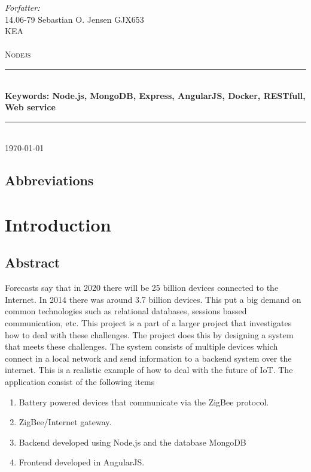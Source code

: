 \documentclass[a4paper,12pt,english]{article}
\begin{document}
\begin{titlepage}

\newcommand{\HRule}{\rule{\linewidth}{0.4mm}}
\center
\small{ \emph{Forfatter:}\\
14.06-79 Sebastian O. Jensen \textsc{GJX653}
} \\[2cm]

\textsc{\LARGE KEA}\\[0.5cm]
\textsc{\large}\\[1.5cm]
\textsc{\huge Nodejs}\\
\HRule \\[0.7cm]
{\bfseries Keywords: Node.js, MongoDB, Express, AngularJS, Docker,
RESTfull, Web service}\\[0.4cm]
\HRule
\\[1.5cm] \textsc{\Large \textsc{\today}}\\[0.5cm]

\end{titlepage}
\tableofcontents


\clearpage
\subsection{Abbreviations}
\renewcommand{\nomname}{}
\renewcommand{\pagedeclaration}[1]{}
\pagestyle{empty}
\printnomenclature[3cm]
\clearpage
\section{Introduction}
\subsection{Abstract}
Forecasts say that in 2020 there will be 25 billion devices connected to the
Internet. In 2014 there was around 3.7 billion devices\cite{Gartner}.
This put a big demand on common technologies such as relational
databases, sessions bassed communication, etc. This project
is a part of a larger project that investigates how to deal with
these challenges. The project does this by designing a system that
meets these challenges. The system consists of multiple devices which connect
in a local network and send information to a backend system over the internet.
This is a realistic example of how to deal with the future of
IoT. The application consist of the
following items
\begin{enumerate}
  \item Battery powered devices that communicate via the ZigBee protocol.
  \item ZigBee/Internet gateway.
  \item Backend developed using Node.js and the database MongoDB
  \item Frontend developed in AngularJS.
\end{enumerate}
\end{document}
